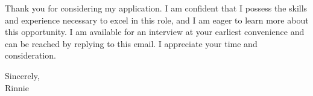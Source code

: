 \documentclass[letterpaper,11pt]{article}
\begin{document}
Thank you for considering my application. I am confident that I possess the skills and experience necessary to excel in this role, and I am eager to learn more about this opportunity. I am available for an interview at your earliest convenience and can be reached by replying to this email. I appreciate your time and consideration.
\vspace{20pt}

Sincerely, \\
\vspace{40pt} %
Rinnie
\end{document}
